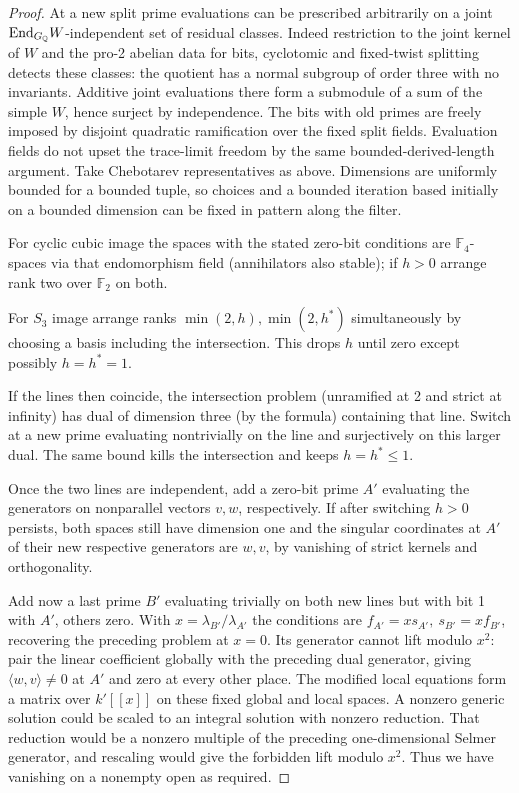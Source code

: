 \begin{proof}
At a new split prime evaluations can be prescribed arbitrarily on a joint \({\rm End}_{G_\mathbb Q} W\)-independent set of residual classes. Indeed restriction to the joint kernel of \(W\) and the pro-2 abelian data for bits, cyclotomic and fixed-twist splitting detects these classes: the quotient has a normal subgroup of order three with no invariants. Additive joint evaluations there form a submodule of a sum of the simple \(W\), hence surject by independence. The bits with old primes are freely imposed by disjoint quadratic ramification over the fixed split fields. Evaluation fields do not upset the trace-limit freedom by the same bounded-derived-length argument. Take Chebotarev representatives as above. Dimensions are uniformly bounded for a bounded tuple, so choices and a bounded iteration based initially on a bounded dimension can be fixed in pattern along the filter.

For cyclic cubic image the spaces with the stated zero-bit conditions are \(\mathbb F_4\)-spaces via that endomorphism field (annihilators also stable); if \(h>0\) arrange rank two over \(\mathbb F_2\) on both. 

For \(S_3\) image arrange ranks \(\min(2,h),\min(2,h^*)\) simultaneously by choosing a basis including the intersection. This drops \(h\) until zero except possibly \(h=h^*=1\). 

If the lines then coincide, the intersection problem (unramified at 2 and strict at infinity) has dual of dimension three (by the formula) containing that line. Switch at a new prime evaluating nontrivially on the line and surjectively on this larger dual. The same bound kills the intersection and keeps \(h=h^*\le1\). 

Once the two lines are independent, add a zero-bit prime \(A'\) evaluating the generators on nonparallel vectors \(v,w\), respectively. If after switching \(h>0\) persists, both spaces still have dimension one and the singular coordinates at \(A'\) of their new respective generators are \(w,v\), by vanishing of strict kernels and orthogonality. 

Add now a last prime \(B'\) evaluating trivially on both new lines but with bit 1 with \(A'\), others zero. With \(x=\lambda_{B'}/\lambda_{A'}\) the conditions are \(f_{A'}=x s_{A'},\ s_{B'}=x f_{B'}\), recovering the preceding problem at \(x=0\). Its generator cannot lift modulo \(x^2\): pair the linear coefficient globally with the preceding dual generator, giving \(\langle w,v\rangle\ne0\) at \(A'\) and zero at every other place. The modified local equations form a matrix over \(k'[[x]]\) on
these fixed global and local spaces. A nonzero generic solution could be
scaled to an integral solution with nonzero reduction. That reduction
would be a nonzero multiple of the preceding one-dimensional Selmer
generator, and rescaling would give the forbidden lift modulo \(x^2\). Thus we have vanishing on a nonempty open as required. 


\end{proof}
